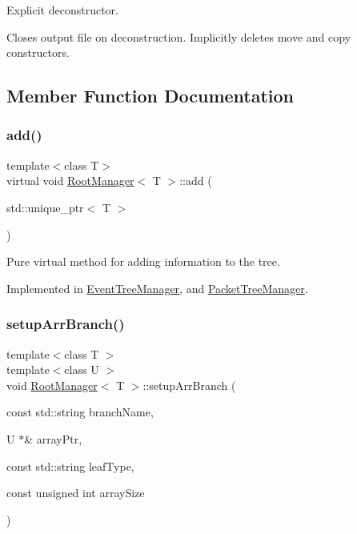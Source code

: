 Explicit deconstructor. 

Closes output file on deconstruction. Implicitly deletes move and copy constructors. 

\subsection{Member Function Documentation}
\mbox{\label{class_root_manager_a2f05eb45d5eaee1f9f12e299395652fb}} 
\subsubsection{\texorpdfstring{add()}{add()}}
{\footnotesize\ttfamily template$<$class T$>$ \\
virtual void \hyperlink{class_root_manager}{Root\+Manager}$<$ T $>$\+::add (\begin{DoxyParamCaption}\item[{std\+::unique\+\_\+ptr$<$ T $>$}]{ }\end{DoxyParamCaption})\hspace{0.3cm}{\ttfamily [pure virtual]}}



Pure virtual method for adding information to the tree. 



Implemented in \hyperlink{class_event_tree_manager_acabb2f6c8dd0e08375b4cf8bf2c148fd}{Event\+Tree\+Manager}, and \hyperlink{class_packet_tree_manager_a855e71512fe6365c11f312584afff70a}{Packet\+Tree\+Manager}.

\mbox{\label{class_root_manager_aa1eaed1aa026059b8d00e729161c6a43}} 
\subsubsection{\texorpdfstring{setup\+Arr\+Branch()}{setupArrBranch()}}
{\footnotesize\ttfamily template$<$class T $>$ \\
template$<$class U $>$ \\
void \hyperlink{class_root_manager}{Root\+Manager}$<$ T $>$\+::setup\+Arr\+Branch (\begin{DoxyParamCaption}\item[{const std\+::string}]{branch\+Name,  }\item[{U $\ast$\&}]{array\+Ptr,  }\item[{const std\+::string}]{leaf\+Type,  }\item[{const unsigned int}]{array\+Size }\end{DoxyParamCaption})\hspace{0.3cm}{\ttfamily [protected]}}



